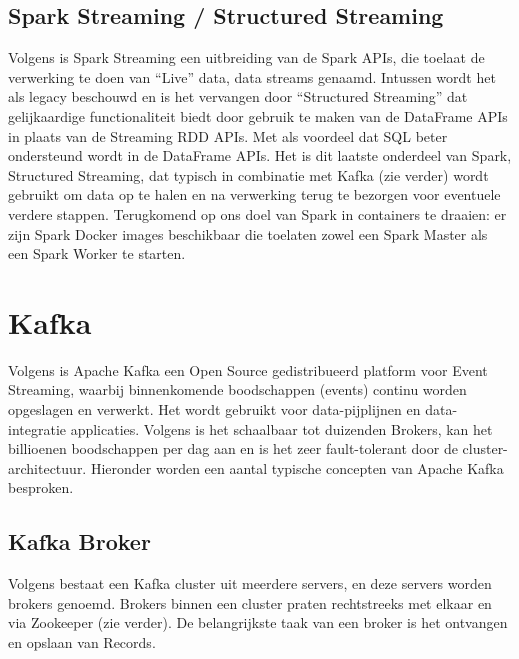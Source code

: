 \subsection{Spark Streaming / Structured Streaming}
Volgens \autocite{Buuck2022} is Spark Streaming een uitbreiding van de Spark APIs, die toelaat de verwerking te doen van ``Live'' data, data streams genaamd. Intussen wordt het als legacy beschouwd en is het vervangen door ``Structured Streaming'' dat gelijkaardige functionaliteit biedt door gebruik te maken van de DataFrame APIs in plaats van de Streaming RDD APIs. Met als voordeel dat SQL beter ondersteund wordt in de DataFrame APIs.
\newline
\newline
Het is dit laatste onderdeel van Spark, Structured Streaming, dat typisch in combinatie met Kafka (zie verder) wordt gebruikt om data op te halen en na verwerking terug te bezorgen voor eventuele verdere stappen.
\newline
\newline
Terugkomend op ons doel van Spark in containers te draaien: er zijn Spark Docker images beschikbaar die toelaten zowel een Spark Master als een Spark Worker te starten.


\section{Kafka}
Volgens \textcite{AwsAmazon2023b} is Apache Kafka een Open Source gedistribueerd platform voor Event Streaming, waarbij binnenkomende boodschappen (events) continu worden opgeslagen en verwerkt. Het wordt gebruikt voor data-pijplijnen en data-integratie applicaties.
Volgens \textcite{ASF2022b} is het schaalbaar tot duizenden Brokers, kan het billioenen boodschappen per dag aan en is het zeer fault-tolerant door de cluster-architectuur. Hieronder worden een aantal typische concepten van Apache Kafka besproken.

\subsection{Kafka Broker}
Volgens \textcite{GitBook2023} bestaat een Kafka cluster uit meerdere servers, en deze servers worden brokers genoemd. Brokers binnen een cluster praten rechtstreeks met elkaar en via Zookeeper (zie verder).
\newline
De belangrijkste taak van een broker is het ontvangen en opslaan van Records.

